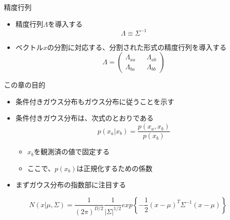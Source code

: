         \begin{frame}{精度行列}
         \begin{itemize}
          \item \alert{精度行列}$\Lambda$を導入する
                \begin{equation}
                 \Lambda \equiv \Sigma^{-1}
                \end{equation}

          \item ベクトル$x$の分割に対応する、分割された形式の精度行列を導入する
                \begin{equation}
                 \Lambda=
                  \begin{pmatrix}
                   \Lambda_{aa} && \Lambda_{ab}\\
                   \Lambda_{ba} && \Lambda_{bb}
                  \end{pmatrix}
                \end{equation}
         \end{itemize}
        \end{frame}


          \begin{frame}{この章の目的}
           \begin{itemize}
            \item 条件付きガウス分布もガウス分布に従うことを示す
            \item 条件付きガウス分布は、次式のとおりである
                  \begin{equation}
                   p(x_a | x_b) = \frac{p(x_a, x_b)}{p(x_b)}
                  \end{equation}
                  \begin{itemize}
                   \item $x_b$を観測済の値で固定する
                   \item ここで、$p(x_b)$は正規化するための係数
                  \end{itemize}
            \item まずガウス分布の指数部に注目する
           \end{itemize}
           \begin{equation}
            N(x|\mu,\Sigma) = \frac{1}{(2\pi)^{D/2}}\frac{1}{|\Sigma|^{1/2}}exp\left\{-\frac{1}{2}(x - \mu)^{T}\Sigma^{-1}(x-\mu)\right\}
           \end{equation}
          \end{frame}


